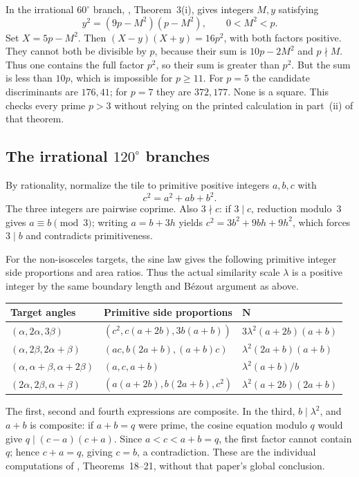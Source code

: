 \documentclass[
  11pt,
  a4paper,
]{article}
\begin{document}
In the irrational $60^\circ$ branch, \cite{equilateral},
Theorem~3(i), gives integers $M,y$ satisfying
\[
y^2=(9p-M^2)(p-M^2),\qquad 0<M^2<p.
\]
Set $X=5p-M^2$. Then $(X-y)(X+y)=16p^2$, with both factors
positive. They cannot both be divisible by $p$, because their sum is
$10p-2M^2$ and $p\nmid M$. Thus one contains the full factor $p^2$,
so their sum is greater than $p^2$. But the sum is less than $10p$,
which is impossible for $p\ge11$. For $p=5$ the candidate
discriminants are $176,41$; for $p=7$ they are $372,177$. None is a
square. This checks every prime $p>3$ without relying on the printed
calculation in part~(ii) of that theorem.

\subsection{The irrational $120^\circ$ branches}

By rationality, normalize the tile to primitive positive integers
$a,b,c$ with
\[
c^2=a^2+ab+b^2.
\]
The three integers are pairwise coprime. Also $3\nmid c$: if
$3\mid c$, reduction modulo~3 gives $a\equiv b\pmod3$; writing
$a=b+3h$ yields $c^2=3b^2+9bh+9h^2$, which forces $3\mid b$
and contradicts primitiveness.

For the non-isosceles targets, the sine law gives the following
primitive integer side proportions and area ratios. Thus the actual
similarity scale $\lambda$ is a positive integer by the same boundary
length and B\'ezout argument as above.

\begin{center}
\small
\begin{tabular}{@{}lll@{}}
\toprule
\textbf{Target angles} & \textbf{Primitive side proportions} & $\boldsymbol{N}$\\
\midrule
$(\alpha,2\alpha,3\beta)$ & $(c^2,c(a+2b),3b(a+b))$ &
$3\lambda^2(a+2b)(a+b)$\\[3pt]
$(\alpha,2\beta,2\alpha+\beta)$ & $(ac,b(2a+b),(a+b)c)$ &
$\lambda^2(2a+b)(a+b)$\\[3pt]
$(\alpha,\alpha+\beta,\alpha+2\beta)$ & $(a,c,a+b)$ &
$\lambda^2(a+b)/b$\\[3pt]
$(2\alpha,2\beta,\alpha+\beta)$ & $(a(a+2b),b(2a+b),c^2)$ &
$\lambda^2(a+2b)(2a+b)$\\
\bottomrule
\end{tabular}
\end{center}

The first, second and fourth expressions are composite. In the third,
$b\mid\lambda^2$, and $a+b$ is composite: if $a+b=q$ were prime,
the cosine equation modulo $q$ would give $q\mid(c-a)(c+a)$.
Since $a<c<a+b=q$, the first factor cannot contain $q$; hence
$c+a=q$, giving $c=b$, a contradiction. These are the individual
computations of \cite{prime}, Theorems~18--21, without that paper's
global conclusion.
\end{document}

